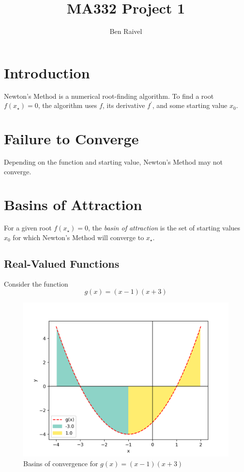 \documentclass[10pt,a4paper]{article}
\title{MA332 Project 1}
\author{Ben Raivel}
\begin{document}
	\maketitle
	\section{Introduction}
	Newton's Method is a numerical root-finding algorithm. To find a root $ f(x_\star) = 0 $, the algorithm uses $f$, its derivative $f^\prime$, and some starting value $x_0$.

	\section{Failure to Converge}
	Depending on the function and starting value, Newton's Method may not converge.
	
	\section{Basins of Attraction}
	For a given root $ f(x_\star) = 0$, the \emph{basin of attraction} is the set of starting values $ x_0 $ for which Newton's Method will converge to $ x_\star $.
	
		\subsection{Real-Valued Functions}
		Consider the function
		$$ g(x) = (x - 1)(x + 3) $$
		
		\begin{figure}[h]
			\caption{Basins of convergence for $g(x) = (x - 1)(x + 3)$}
			\includegraphics[scale=0.75]{figure1}
		\end{figure}
	
\end{document}
